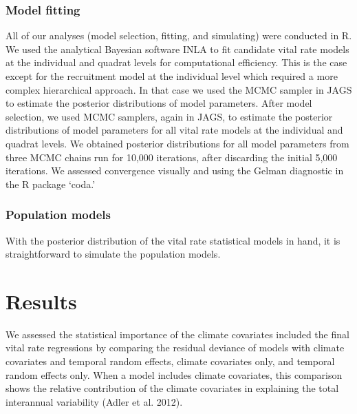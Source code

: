 \documentclass[12pt]{article}
\begin{document}
\subsubsection{Model fitting}
All of our analyses (model selection, fitting, and simulating) were conducted in R. We used the analytical Bayesian software INLA to fit candidate vital rate models at the individual and quadrat levels for computational efficiency. This is the case except for the recruitment model at the individual level which required a more complex hierarchical approach. In that case we used the MCMC sampler in JAGS to estimate the posterior distributions of model parameters. After model selection, we used MCMC samplers, again in JAGS, to estimate the posterior distributions of model parameters for all vital rate models at the individual and quadrat levels. We obtained posterior distributions for all model parameters from three MCMC chains run for 10,000 iterations, after discarding the initial 5,000 iterations. We assessed convergence visually and using the Gelman diagnostic in the R package `coda.'

\subsubsection{Population models}
With the posterior distribution of the vital rate statistical models in hand, it is straightforward to simulate the population models.

\section{Results}
We assessed the statistical importance of the climate covariates included the final vital rate regressions by comparing the residual deviance of models with climate covariates and temporal random effects, climate covariates only, and temporal random effects only. When a model includes climate covariates, this comparison shows the relative contribution of the climate covariates in explaining the total interannual variability (Adler et al. 2012). 
\end{document}
